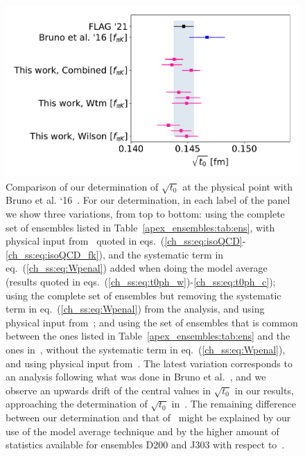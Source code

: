 \begin{figure}
    \centering
    \includegraphics[width=1.\textwidth]{./cap5/figs/t0_compar_FLAG.pdf}
    \caption{Comparison of our determination of $\sqrt{t_0}$ at the physical point with Bruno et al. `16~\citep{Bruno:2016plf}. For our determination, in each label of the panel we show three variations, from top to bottom: using the complete set of ensembles listed in Table~\ref{apex_ensembles:tab:ens}, with physical input from~\citep{FlavourLatticeAveragingGroupFLAG:2021npn} quoted in eqs.~(\ref{ch_ss:eq:isoQCD}-\ref{ch_ss:eq:isoQCD_fk}), and the systematic term in eq.~(\ref{ch_ss:eq:Wpenal}) added when doing the model average (results quoted in eqs.~(\ref{ch_ss:eq:t0ph_w})-\ref{ch_ss:eq:t0ph_c}); using the complete set of ensembles but removing the systematic term in eq.~(\ref{ch_ss:eq:Wpenal}) from the analysis, and using physical input from~\citep{FLAG16}; and using the set of ensembles that is common between the ones listed in Table~\ref{apex_ensembles:tab:ens} and the ones in~\citep{Bruno:2016plf}, without the systematic term in eq.~(\ref{ch_ss:eq:Wpenal}), and using physical input from~\citep{FLAG16}. The latest variation corresponds to an analysis following what was done in Bruno et al.~\citep{Bruno:2016plf}, and we observe an upwards drift of the central values in $\sqrt{t_0}$ in our results, approaching the determination of $\sqrt{t_0}$ in~\citep{Bruno:2016plf}. The remaining difference between our determination and that of~\citep{Bruno:2016plf} might be explained by our use of the model average technique and by the higher amount of statistics available for ensembles D200 and J303 with respect to~\citep{Bruno:2016plf}.}
    \label{ch_ss:fig:FLAG}
\end{figure}

